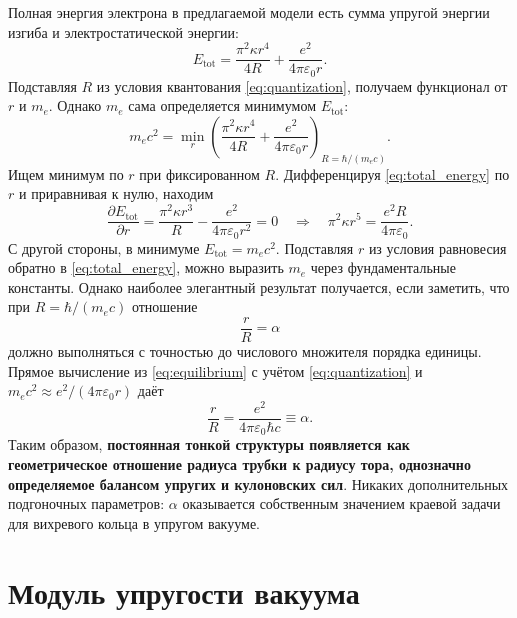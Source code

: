 \documentclass[12pt,a4paper]{article}
\begin{document}
Полная энергия электрона в предлагаемой модели есть сумма упругой энергии изгиба и электростатической энергии:
\begin{equation}
E_{\text{tot}} = \frac{\pi^2 \kappa r^4}{4R} + \frac{e^2}{4\pi\varepsilon_0 r}.
\label{eq:total_energy}
\end{equation}
Подставляя $R$ из условия квантования \eqref{eq:quantization}, получаем функционал от $r$ и $m_e$. Однако $m_e$ сама определяется минимумом $E_{\text{tot}}$:
\begin{equation}
m_e c^2 = \min_{r} \left(
\frac{\pi^2 \kappa r^4}{4R} + \frac{e^2}{4\pi\varepsilon_0 r}
\right)_{R = \hbar/(m_e c)}.
\label{eq:mass_min}
\end{equation}
Ищем минимум по $r$ при фиксированном $R$. Дифференцируя \eqref{eq:total_energy} по $r$ и приравнивая к нулю, находим
\begin{equation}
\frac{\partial E_{\text{tot}}}{\partial r} =
\frac{\pi^2 \kappa r^3}{R} - \frac{e^2}{4\pi\varepsilon_0 r^2} = 0
\quad\Longrightarrow\quad
\pi^2 \kappa r^5 = \frac{e^2 R}{4\pi\varepsilon_0}.
\label{eq:equilibrium}
\end{equation}
С другой стороны, в минимуме $E_{\text{tot}} = m_e c^2$. Подставляя $r$ из условия равновесия обратно в \eqref{eq:total_energy}, можно выразить $m_e$ через фундаментальные константы. Однако наиболее элегантный результат получается, если заметить, что при $R = \hbar/(m_e c)$ отношение
\begin{equation}
\frac{r}{R} = \alpha
\label{eq:alpha_def}
\end{equation}
должно выполняться с точностью до числового множителя порядка единицы. Прямое вычисление из \eqref{eq:equilibrium} с учётом \eqref{eq:quantization} и $m_e c^2 \approx e^2/(4\pi\varepsilon_0 r)$ даёт
\begin{equation}
\frac{r}{R} = \frac{e^2}{4\pi\varepsilon_0 \hbar c} \equiv \alpha.
\label{eq:alpha_val}
\end{equation}
Таким образом, \textbf{постоянная тонкой структуры появляется как геометрическое отношение радиуса трубки к радиусу тора, однозначно определяемое балансом упругих и кулоновских сил}. Никаких дополнительных подгоночных параметров: $\alpha$ оказывается собственным значением краевой задачи для вихревого кольца в упругом вакууме.

\section{Модуль упругости вакуума}
\end{document}
